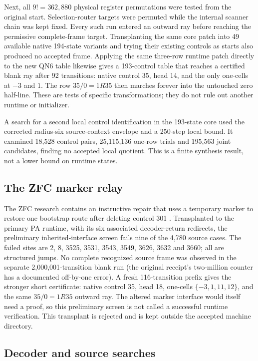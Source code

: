 \documentclass[11pt,letterpaper]{article}
\begin{document}
Next, all $9!=362,880$ physical register permutations were tested from the
original start. Selection-router targets were permuted while the internal
scanner chain was kept fixed. Every such run entered an outward ray before
reaching the permissive complete-frame target. Transplanting the same core
patch into 49 available native 194-state variants and trying their existing
controls as starts also produced no accepted frame. Applying the same
three-row runtime patch directly to the new QN6 table likewise gives a
193-control table that reaches a certified blank ray after 92 transitions:
native control 35, head 14, and the only one-cells at $-3$ and $1$.
The row $35/0=1R35$ then marches forever into the untouched zero half-line.
These are tests of
specific transformations; they do not rule out another runtime or initializer.

A search for a second local control identification in the 193-state core
used the corrected radius-six source-context envelope and a 250-step local
bound. It examined 18,528 control pairs, 25,115,136 one-row trials and
195,563 joint candidates, finding no accepted local quotient. This is a
finite synthesis result, not a lower bound on runtime states.

\subsection{The ZFC marker relay}

The ZFC research contains an instructive repair that uses a temporary marker
to restore one bootstrap route after deleting control 301
\cite{zfcrelay}. Transplanted to the primary PA runtime, with its six
associated decoder-return redirects, the preliminary inherited-interface
screen fails nine of the 4,780 source cases. The failed sites are
2, 8, 3525, 3531, 3543, 3549, 3626, 3632 and 3660; all are structured
jumps. No complete recognized source frame was observed in the separate
2,000,001-transition blank run (the original receipt's two-million counter
has a documented off-by-one error). A fresh 116-transition prefix gives
the stronger short certificate: native control 35, head 18, one-cells
$\{-3,1,11,12\}$, and the same $35/0=1R35$ outward ray. The altered marker interface would itself
need a proof, so this preliminary screen is not called a successful runtime
verification. This transplant is rejected and is kept outside the accepted
machine directory.

\subsection{Decoder and source searches}
\end{document}
